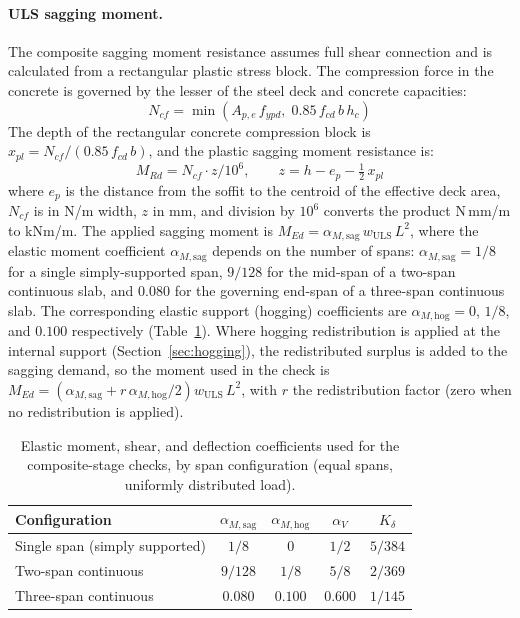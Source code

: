 \paragraph{ULS sagging moment.} The composite sagging moment resistance assumes full shear connection and is calculated from a rectangular plastic stress block. The compression force in the concrete is governed by the lesser of the steel deck and concrete capacities:
\begin{equation}
    N_{cf} = \min\!\left(A_{p,e}\,f_{ypd},\; 0.85\,f_{cd}\,b\,h_c\right)
    \label{eq:Ncf}
\end{equation}
The depth of the rectangular concrete compression block is $x_{pl} = N_{cf}/(0.85\,f_{cd}\,b)$, and the plastic sagging moment resistance is:
\begin{equation}
    M_{Rd} = N_{cf} \cdot z / 10^6, \qquad z = h - e_p - \tfrac{1}{2}\,x_{pl}
    \label{eq:comp_mrd_full}
\end{equation}
where $e_p$ is the distance from the soffit to the centroid of the effective deck area, $N_{cf}$ is in N/m width, $z$ in mm, and division by $10^6$ converts the product N\,mm/m to kNm/m. The applied sagging moment is $M_{Ed} = \alpha_{M,\mathrm{sag}}\, w_\mathrm{ULS}\, L^2$, where the elastic moment coefficient $\alpha_{M,\mathrm{sag}}$ depends on the number of spans: $\alpha_{M,\mathrm{sag}} = 1/8$ for a single simply-supported span, $9/128$ for the mid-span of a two-span continuous slab, and $0.080$ for the governing end-span of a three-span continuous slab. The corresponding elastic support (hogging) coefficients are $\alpha_{M,\mathrm{hog}} = 0$, $1/8$, and $0.100$ respectively (Table~\ref{tab:moment_coeffs}). Where hogging redistribution is applied at the internal support (Section~\ref{sec:hogging}), the redistributed surplus is added to the sagging demand, so the moment used in the check is $M_{Ed} = \left(\alpha_{M,\mathrm{sag}} + r\,\alpha_{M,\mathrm{hog}}/2\right) w_\mathrm{ULS}\, L^2$, with $r$ the redistribution factor (zero when no redistribution is applied).

\begin{table}[h!]
\small
\centering
\caption{Elastic moment, shear, and deflection coefficients used for the composite-stage checks, by span configuration (equal spans, uniformly distributed load).}
\label{tab:moment_coeffs}
\begin{tabular}{lcccc}
\toprule
Configuration & $\alpha_{M,\mathrm{sag}}$ & $\alpha_{M,\mathrm{hog}}$ & $\alpha_V$ & $K_\delta$ \\
\midrule
Single span (simply supported) & $1/8$    & $0$     & $1/2$   & $5/384$ \\
Two-span continuous             & $9/128$  & $1/8$   & $5/8$   & $2/369$ \\
Three-span continuous           & $0.080$  & $0.100$ & $0.600$ & $1/145$ \\
\bottomrule
\end{tabular}
\end{table}

